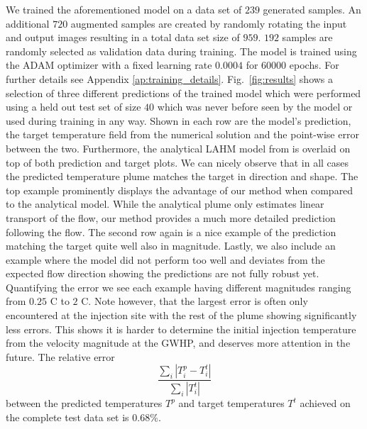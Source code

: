 \documentclass{article} %
\begin{document}

We trained the aforementioned model on a data set of $239$ generated samples. An additional $720$ augmented samples are created by randomly rotating the input and output images resulting in a total data set size of $959$. $192$ samples are randomly selected as validation data during training.
The model is trained using the ADAM optimizer \citep{adam} with a fixed learning rate $0.0004$ for $60000$ epochs.
For further details see Appendix \ref{ap:training_details}.
Fig.~\ref{fig:results} shows a selection of three different predictions of the trained model which were performed using a held out test set of size $40$ which was never before seen by the model or used during training in any way.
Shown in each row are the model's prediction, the target temperature field from the numerical solution and the point-wise error between the two.
Furthermore, the analytical LAHM model from \citet{Pophillat2020} is overlaid on top of both prediction and target plots.
We can nicely observe that in all cases the predicted temperature plume matches the target in direction and shape.
The top example prominently displays the advantage of our method when compared to the analytical model.
While the analytical plume only estimates linear transport of the flow, our method provides a much more detailed prediction following the flow.
The second row again is a nice example of the prediction matching the target quite well also in magnitude.
Lastly, we also include an example where the model did not perform too well and deviates from the expected flow direction showing the predictions are not fully robust yet.
Quantifying the error we see each example having different magnitudes ranging from $0.25$ \degree C to $2$ \degree C.
Note however, that the largest error is often only encountered at the injection site with the rest of the plume showing significantly less errors. 
This shows it is harder to determine the initial injection temperature from the velocity magnitude at the GWHP, and deserves more attention in the future. 
The relative error
\begin{equation*}
    \frac{\sum_i \left| T^p_i - T^t_i \right|}{\sum_i \left| T^t_i \right|}
\end{equation*}
between the predicted temperatures $T^p$ and target temperatures $T^t$ achieved on the complete test data set is $0.68 \%$.
\end{document}
